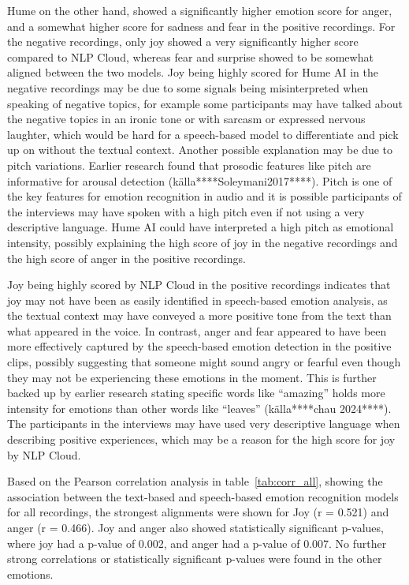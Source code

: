 Hume on the other hand, showed a significantly higher emotion score for anger, and a somewhat higher score for sadness and fear in the positive recordings. For the negative recordings, only joy showed a very significantly higher score compared to NLP Cloud, whereas fear and surprise showed to be somewhat aligned between the two models. Joy being highly scored for Hume AI in the negative recordings may be due to some signals being misinterpreted when speaking of negative topics, for example some participants may have talked about the negative topics in an ironic tone or with sarcasm or expressed nervous laughter, which would be hard for a speech-based model to differentiate and pick up on without the textual context.
Another possible explanation may be due to pitch variations. Earlier research found that prosodic features like pitch are informative for arousal detection (källa****Soleymani2017****). Pitch is one of the key features for emotion recognition in audio and it is possible participants of the interviews may have spoken with a high pitch even if not using a very descriptive language. Hume AI could have interpreted a high pitch as emotional intensity, possibly explaining the high score of joy in the negative recordings and the high score of anger in the positive recordings.

Joy being highly scored by NLP Cloud in the positive recordings indicates that joy may not have been as easily identified in speech-based emotion analysis, as the textual context may have conveyed a more positive tone from the text than what appeared in the voice. In contrast, anger and fear appeared to have been more effectively captured by the speech-based emotion detection in the positive clips, possibly suggesting that someone might sound angry or fearful even though they may not be experiencing these emotions in the moment. This is further backed up by earlier research stating specific words like “amazing” holds more intensity for emotions than other words like “leaves” (källa****chau 2024****). The participants in the interviews may have used very descriptive language when describing positive experiences, which may be a reason for the high score for joy by NLP Cloud.


Based on the Pearson correlation analysis in table~\ref{tab:corr_all}, showing the association between the text-based and speech-based emotion recognition models for all recordings, the strongest alignments were shown for Joy (r = 0.521) and anger (r = 0.466). Joy and anger also showed statistically significant p-values, where joy had a p-value of 0.002, and anger had a p-value of 0.007. No further strong correlations or statistically significant p-values were found in the other emotions.

